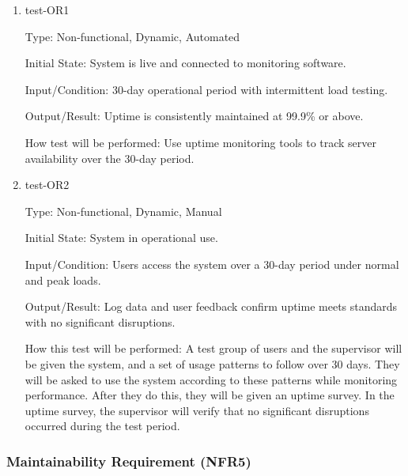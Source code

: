 \documentclass[12pt, titlepage]{article}
\begin{document}
\begin{enumerate}
    \item{test-OR1} \label{test-OR1}
    
    Type: Non-functional, Dynamic, Automated
    
    Initial State: System is live and connected to monitoring software.
    
    Input/Condition: 30-day operational period with intermittent load testing.
    
    Output/Result: Uptime is consistently maintained at 99.9\% or above.
    
    How test will be performed: Use uptime monitoring tools to track server availability over the 30-day period.

    \item{test-OR2} \label{test-OR2}
    
    Type: Non-functional, Dynamic, Manual
    
    Initial State: System in operational use.
    
    Input/Condition: Users access the system over a 30-day period under normal and peak loads.
    
    Output/Result: Log data and user feedback confirm uptime meets standards with no significant disruptions.
    
    How this test will be performed: A test group of users and the supervisor will be given the system, and a set of usage patterns to follow over 30 days. They will be asked to use the system according to these patterns while monitoring performance. After they do this, they will be given an uptime survey. In the uptime survey, the supervisor will verify that no significant disruptions occurred during the test period.
\end{enumerate}

\subsubsection{Maintainability Requirement (NFR5)} \label{section:4.2.5}
\end{document}
